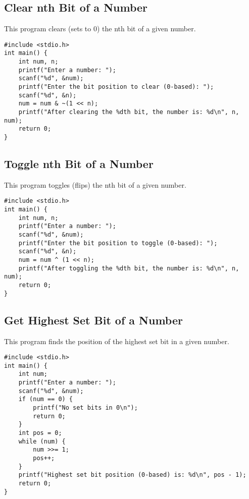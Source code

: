 \documentclass[a4paper,12pt]{article}
\begin{document}
\newpage

\subsection{Clear nth Bit of a Number}
This program clears (sets to 0) the nth bit of a given number.

\begin{lstlisting}[caption={Clear nth Bit of a Number}]
#include <stdio.h>
int main() {
    int num, n;
    printf("Enter a number: ");
    scanf("%d", &num);
    printf("Enter the bit position to clear (0-based): ");
    scanf("%d", &n);
    num = num & ~(1 << n);
    printf("After clearing the %dth bit, the number is: %d\n", n, num);
    return 0;
}
\end{lstlisting}

\newpage

\subsection{Toggle nth Bit of a Number}
This program toggles (flips) the nth bit of a given number.

\begin{lstlisting}[caption={Toggle nth Bit of a Number}]
#include <stdio.h>
int main() {
    int num, n;
    printf("Enter a number: ");
    scanf("%d", &num);
    printf("Enter the bit position to toggle (0-based): ");
    scanf("%d", &n);
    num = num ^ (1 << n);
    printf("After toggling the %dth bit, the number is: %d\n", n, num);
    return 0;
}
\end{lstlisting}

\newpage

\subsection{Get Highest Set Bit of a Number}
This program finds the position of the highest set bit in a given number.

\begin{lstlisting}[caption={Get Highest Set Bit of a Number}]
#include <stdio.h>
int main() {
    int num;
    printf("Enter a number: ");
    scanf("%d", &num);
    if (num == 0) {
        printf("No set bits in 0\n");
        return 0;
    }
    int pos = 0;
    while (num) {
        num >>= 1;
        pos++;
    }
    printf("Highest set bit position (0-based) is: %d\n", pos - 1);
    return 0;
}
\end{lstlisting}
\end{document}

